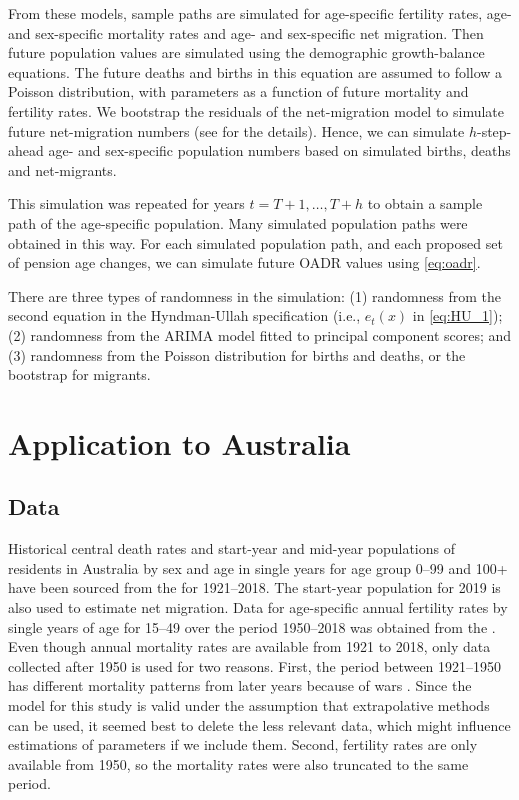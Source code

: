 \documentclass[
  doublespace]{anzsauth}
\begin{document}
From these models, sample paths are simulated for age-specific fertility rates, age- and sex-specific mortality rates and age- and sex-specific net migration. Then future population values are simulated using the demographic growth-balance equations. The future deaths and births in this equation are assumed to follow a Poisson distribution, with parameters as a function of future mortality and fertility rates. We bootstrap the residuals of the net-migration model to simulate future net-migration numbers (see \citet{HB08} for the details). Hence, we can simulate \(h\)-step-ahead age- and sex-specific population numbers based on simulated births, deaths and net-migrants.

This simulation was repeated for years \(t=T+1,\dots,T+h\) to obtain a sample path of the age-specific population. Many simulated population paths were obtained in this way. For each simulated population path, and each proposed set of pension age changes, we can simulate future OADR values using \eqref{eq:oadr}.

There are three types of randomness in the simulation: (1) randomness from the second equation in the Hyndman-Ullah specification (i.e., \(e_t(x)\) in \eqref{eq:HU_1}); (2) randomness from the ARIMA model fitted to principal component scores; and (3) randomness from the Poisson distribution for births and deaths, or the bootstrap for migrants.

\hypertarget{sec:results}{%
\section{Application to Australia}\label{sec:results}}

\hypertarget{data}{%
\subsection{Data}\label{data}}

Historical central death rates and start-year and mid-year populations of residents in Australia by sex and age in single years for age group 0--99 and 100+ have been sourced from the \citet{HMD} for 1921--2018. The start-year population for 2019 is also used to estimate net migration. Data for age-specific annual fertility rates by single years of age for 15--49 over the period 1950--2018 was obtained from the \citet{ABSBirths}. Even though annual mortality rates are available from 1921 to 2018, only data collected after 1950 is used for two reasons. First, the period between 1921--1950 has different mortality patterns from later years because of wars \citep{HB08}. Since the model for this study is valid under the assumption that extrapolative methods can be used, it seemed best to delete the less relevant data, which might influence estimations of parameters if we include them. Second, fertility rates are only available from 1950, so the mortality rates were also truncated to the same period.
\end{document}
